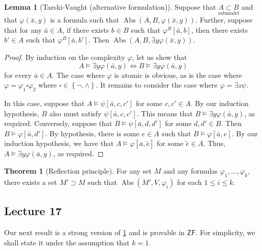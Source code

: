 \documentclass[10pt,letterpaper,cm]{nupset}
\theoremstyle{definition}
\theoremstyle{theorem}
\newtheorem{theorem}[definition]{Theorem}
\newtheorem{lemma}[definition]{Lemma}
\theoremstyle{remark}
\newcommand{\1}{\mathbf{1}}
\newcommand{\0}{\vec 0}
\newcommand{\zf}{\mathsf{ZF}}
\DeclareMathOperator{\abs}{Abs}
\begin{document}
\begin{lemma}[Tarski-Vaught (alternative formulation)]
Suppose that $\underset{\text{submodel}}{A \subset B}$ and that $\varphi(\bar{x}, y)$ is a formula such that $\abs(A, B, \varphi(\bar{x}, y))$. Further, suppose that for any $\bar{a} \in A$, if there exists $b\in B$ such that $\varphi^B[\bar{a}, b]$, then there exists $b' \in A$ such that $\varphi^B[\bar{a}, b']$. Then $\abs(A, B, \exists{y}\varphi(\bar{x}, y))$.
\end{lemma}
\begin{proof}
By induction on the complexity $\varphi$, let us show that $$A\models \exists{y}\varphi(\bar{a}, y) \iff B\models \exists{y}\varphi(\bar{a}, y) $$ for every $\bar{a}\in A$.  The case where $\varphi$ is atomic is obvious, as is the case where $\varphi   = \varphi_1 \square \varphi_2$ where $\square \in \left\{\neg, \land\right\}$. It remains to consider the case where $\varphi = \exists{z}\psi$. 

\smallskip

In this case, suppose that $A \models \psi[\bar{a},c, c']$ for some $c,c'\in A$. By our induction hypothesis, $B$ also must satisfy  $\psi[\bar{a},c, c']$. This means that $B\models \exists{y}\varphi(\bar{a},y)$, as required.
Conversely, suppose that $B\models \psi[\bar{a}, d, d']$ for some $d,d'\in B$. Then $B\models \varphi[\bar{a}, d']$. By hypothesis, there is some $e\in A$ such that $B \models \varphi[\bar{a}, e]$. By our induction hypothesis, we have that $A \models \varphi[\bar{a}, \tilde{e}]$ for some $\tilde{e}\in A$. Thus, $A\models \exists{y}\varphi(\bar{a},y)$, as required.

\end{proof}

\begin{theorem}[Reflection principle]\label{RP}
For any set $M$ and any formulas $\varphi_1, \ldots, \varphi_k$, there exists a set $M' \supset M$ such that $\abs(M', V, \varphi_i)$ for each $1\leq i \leq k$.
\end{theorem}

\subsection{Lecture 17}

Our next result is a strong version of \cref{RP} and is provable in $\zf$. For simplicity, we shall state it under the assumption that $k=1$.
\end{document}
